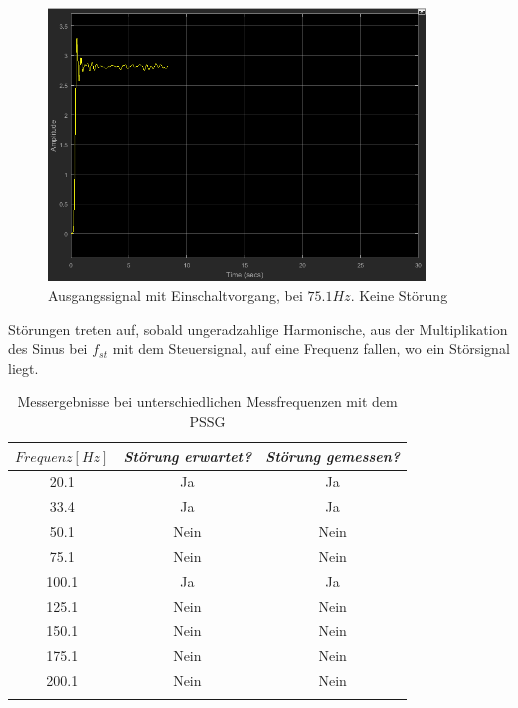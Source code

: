 \documentclass[a4paper,12pt]{article}
\begin{document}
	\begin{figure}[H]
		\centering
		\includegraphics[width=10cm]{assets/pssg-75_1Hz}
		\caption{Ausgangssignal mit Einschaltvorgang, bei $75.1Hz$. Keine Störung}
	\end{figure}
	\noindent
	Störungen treten auf, sobald ungeradzahlige Harmonische, aus der Multiplikation des Sinus bei $f_{st}$ mit dem Steuersignal, auf eine Frequenz fallen, wo ein Störsignal liegt.\\ \newline
	\begin{longtable}[c]{|c|c|c|}
		\hline
		\textit{$Frequenz[Hz]$} & \textit{Störung erwartet?} & \textit{Störung gemessen?} \\ \hline
		\endfirsthead
		\endhead
		20.1 & Ja & Ja \\ \hline
		33.4 & Ja & Ja \\ \hline
		50.1 & Nein & Nein \\ \hline
		75.1 & Nein & Nein \\ \hline
		100.1 & Ja & Ja \\ \hline
		125.1 & Nein & Nein \\ \hline
		150.1 & Nein & Nein \\ \hline
		175.1 & Nein & Nein \\ \hline
		200.1 & Nein & Nein \\ \hline
		\caption{Messergebnisse bei unterschiedlichen Messfrequenzen mit dem PSSG}
		\label{tab:my-table}\\
	\end{longtable}
	\newpage
\end{document}
